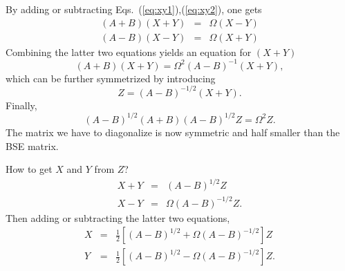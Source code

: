 \documentclass[aps,prb,reprint,showpacs]{revtex4-1}
\def\half{\frac{1}{2}}
\begin{document}
By adding or subtracting Eqs.~(\ref{eq:xy1}),(\ref{eq:xy2}), one gets
\begin{subequations}
\begin{eqnarray}
 ( A + B ) ( X + Y ) & = &  \Omega ( X - Y ) \\
 ( A - B ) ( X - Y ) & = &  \Omega ( X + Y ) 
\end{eqnarray}
\end{subequations}
Combining the latter two equations yields an equation for $(X+Y)$
\begin{equation}
 ( A + B ) ( X+Y ) = \Omega^2 (A-B)^{-1} (X+Y) ,
\end{equation}
which can be further symmetrized by introducing
\begin{equation}
 Z = (A-B)^{-1/2} (X+Y) .
\end{equation}
Finally,
\begin{equation}
 (A-B)^{1/2}(A+B)(A-B)^{1/2} Z = \Omega^2 Z .
\end{equation}
The matrix we have to diagonalize is now symmetric and half smaller than the BSE matrix.

How to get $X$ and $Y$ from $Z$? 
\begin{subequations}
\begin{eqnarray}
  X + Y &=& (A-B)^{1/2} Z \\
  X - Y &=& \Omega (A-B)^{-1/2} Z .
\end{eqnarray}
\end{subequations}
Then adding or subtracting the latter two equations,
\begin{subequations}
\begin{eqnarray}
  X  &=&  \half \left[ (A-B)^{1/2} + \Omega (A-B)^{-1/2}  \right] Z  \\
  Y  &=&  \half \left[ (A-B)^{1/2} - \Omega (A-B)^{-1/2}  \right] Z .
\end{eqnarray}
\end{subequations}
\end{document}
